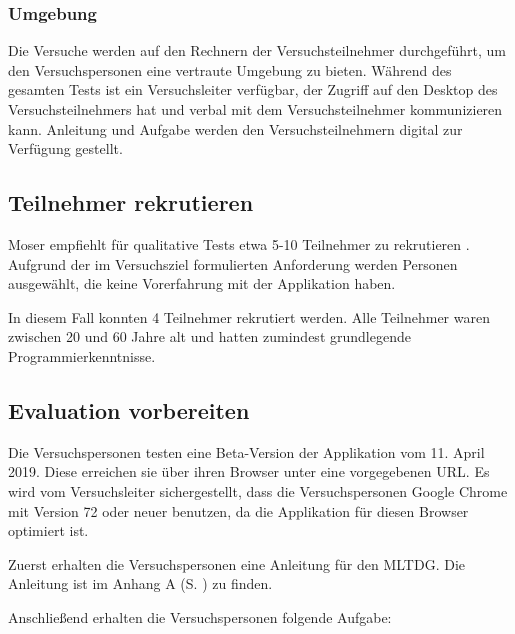 \subsubsection*{Umgebung}
Die Versuche werden auf den Rechnern der Versuchsteilnehmer durchgeführt, um den Versuchspersonen eine vertraute Umgebung zu bieten. Während des gesamten Tests ist ein Versuchsleiter verfügbar, der Zugriff auf den Desktop des Versuchsteilnehmers hat und verbal mit dem Versuchsteilnehmer kommunizieren kann. Anleitung und Aufgabe werden den Versuchsteilnehmern digital zur Verfügung gestellt.

\subsection{Teilnehmer rekrutieren}

Moser empfiehlt für qualitative Tests etwa 5-10 Teilnehmer zu rekrutieren \cite{Moser2012}. Aufgrund der im Versuchsziel formulierten Anforderung werden Personen ausgewählt, die keine Vorerfahrung mit der Applikation haben.

In diesem Fall konnten 4 Teilnehmer rekrutiert werden. Alle Teilnehmer waren zwischen 20 und 60 Jahre alt und hatten zumindest grundlegende Programmierkenntnisse.

\subsection{Evaluation vorbereiten}

Die Versuchspersonen testen eine Beta-Version der Applikation vom 11. April 2019. Diese erreichen sie über ihren Browser unter eine vorgegebenen URL. Es wird vom Versuchsleiter sichergestellt, dass die Versuchspersonen Google Chrome mit Version 72 oder neuer benutzen, da die Applikation für diesen Browser optimiert ist.

Zuerst erhalten die Versuchspersonen eine Anleitung für den \ac{MLTDG}. Die Anleitung ist im Anhang A (S. \pageref{apx:manual}) zu finden.

Anschließend erhalten die Versuchspersonen folgende Aufgabe:

